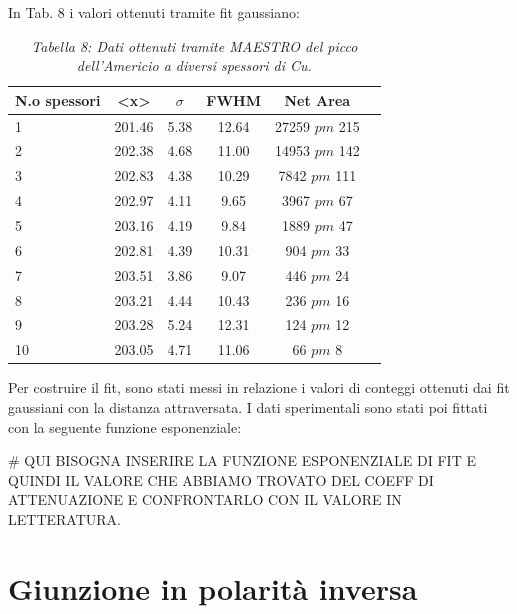 \documentclass[a4paper]{article}
\begin{document}
In Tab. 8 i valori ottenuti tramite fit gaussiano:

 
\begin{table}[!h]
	\centering
		\begin{tabular}{lccccc}
			\hline
			\hline
			\textbf{N.o spessori} & \textbf{<x>}  &   \textbf{$\sigma$} &\textbf{FWHM}   & \textbf{Net Area}	\\
			\hline
			\hline
				      1 &  201.46   & 5.38 &  12.64  &  27259	$pm$	215	\\
				      2 &  202.38   & 4.68 & 11.00	&  14953	$pm$	142 \\
				      3 &  202.83	& 4.38 & 10.29	&  7842		$pm$	111 \\
				      4 &  202.97	& 4.11 & 9.65	&  3967	$pm$	67 \\
				      5 &  203.16	& 4.19 & 9.84	&  1889	$pm$	47 \\
				      6 &  202.81	& 4.39 & 10.31	&  904	$pm$	33 \\
				      7 &  203.51	& 3.86 & 9.07	&  446	$pm$	24 \\
				      8 &  203.21	& 4.44 & 10.43	&  236	$pm$	16 \\
				      9 &  203.28	& 5.24 & 12.31	&  124	$pm$	12 \\
				      10 & 203.05	& 4.71 & 11.06	&  66	$pm$	8 \\
			\hline
			\hline
		\end{tabular}
		\linebreak
		\caption{\textit{Tabella 8: Dati ottenuti tramite MAESTRO del picco dell'Americio a diversi spessori di Cu.}}\label{tab:8} 
	\end{table}	

Per costruire il fit, sono stati messi in relazione i valori di conteggi ottenuti dai fit gaussiani con la distanza attraversata. I dati sperimentali sono stati poi fittati con la seguente funzione esponenziale:

$\#$	QUI BISOGNA INSERIRE LA FUNZIONE ESPONENZIALE DI FIT E QUINDI IL VALORE CHE ABBIAMO TROVATO DEL COEFF DI ATTENUAZIONE E CONFRONTARLO CON IL VALORE IN LETTERATURA.
\section{Giunzione in polarità inversa}


	



		
  
\end{document}
